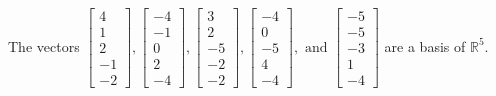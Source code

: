 \begin{exercise}
\begin{exerciseStatement}
  \end{exerciseStatement}
  \begin{exerciseAnswer}
   The vectors \(\left[\begin{array}{r}
4 \\
1 \\
2 \\
-1 \\
-2
\end{array}\right] , \left[\begin{array}{r}
-4 \\
-1 \\
0 \\
2 \\
-4
\end{array}\right] , \left[\begin{array}{r}
3 \\
2 \\
-5 \\
-2 \\
-2
\end{array}\right] , \left[\begin{array}{r}
-4 \\
0 \\
-5 \\
4 \\
-4
\end{array}\right] , \text{ and } \left[\begin{array}{r}
-5 \\
-5 \\
-3 \\
1 \\
-4
\end{array}\right]\) 
  	 are  a basis of \(\mathbb{R}^5\).
  


  \end{exerciseAnswer}
\end{exercise}